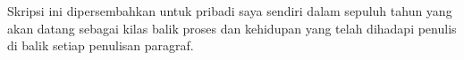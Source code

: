 \vspace{7cm}

\begin{center}
	
	Skripsi ini dipersembahkan untuk pribadi saya sendiri dalam sepuluh tahun yang akan datang sebagai kilas balik proses dan kehidupan yang telah dihadapi penulis di balik setiap penulisan paragraf.
		
\end{center}


